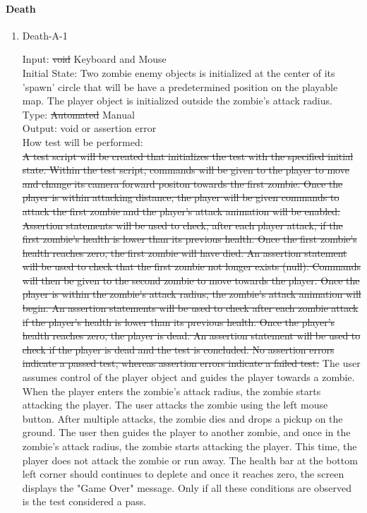 \documentclass[12pt, titlepage]{article}
\DeclareRobustCommand{\hsout}[1]{\texorpdfstring{\sout{#1}}{#1}}
\newcounter{ftnum}
\begin{document}
\paragraph{Death}

\begin{enumerate}

\item{Death-A-1\\}  \label{F18-1}

Input: \hsout{void} {\color{magenta} Keyboard and Mouse} \\
					
Initial State: Two zombie enemy objects is initialized at the center of its 'spawn' circle that will be have a predetermined position on the playable map. The player object is initialized outside the zombie's attack radius.\\
					
Type: \hsout{Automated} {\color{magenta} Manual} \\
					
Output: void or assertion error \\
					
How test will be performed:\\  \hsout{A test script will be created that initializes the test with the specified initial state. Within the test script, commands will be given to the player to move and change its camera forward positon towards the first zombie. Once the player is within attacking distance, the player will be given commands to attack the first zombie and the player's attack animation will be enabled. Assertion statements will be used to check, after each player attack, if the first zombie's health is lower than its previous health. Once the first zombie's health reaches zero, the first zombie will have died. An assertion statement will be used to check that the first zombie not longer exists (null). Commands will then be given to the second zombie to move towards the player. Once the player is within the zombie's attack radius, the zombie's attack animation will begin.  An assertion statements will be used to check after each zombie attack if the player's health is lower than its previous health. Once the player's health reaches zero, the player is dead. An assertion statement will be used to check if the player is dead and the test is concluded. No assertion errors indicate a passed test, whereas assertion errors indicate a failed test.}
{\color{magenta}The user assumes control of the player object and guides the player towards a zombie. When the player enters the zombie's attack radius, the zombie starts attacking the player. The user attacks the zombie using the left mouse button. After multiple attacks, the zombie dies and drops a pickup on the ground. The user then guides the player to another zombie, and once in the zombie's attack radius, the zombie starts attacking the player. This time, the player does not attack the zombie or run away. The health bar at the bottom left corner should continues to deplete and once it reaches zero, the screen displays the "Game Over" message. Only if all these conditions are observed is the test considered a pass.}\\


\end{enumerate}
\end{document}
